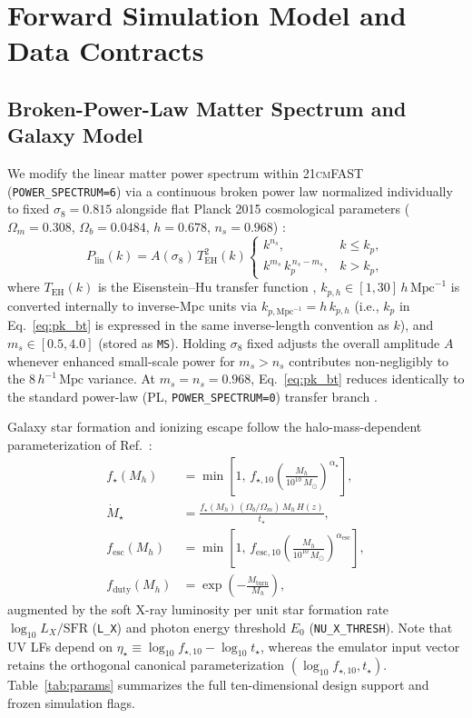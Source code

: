\documentclass[aps,prd,reprint,superscriptaddress,nofootinbib,amsmath,amssymb,floatfix,longbibliography]{revtex4-2}
\begin{document}
\section{Forward Simulation Model and Data Contracts}\label{sec:model}

\subsection{Broken-Power-Law Matter Spectrum and Galaxy Model}\label{sec:bt_model}

We modify the linear matter power spectrum within \textsc{21cmFAST} (\texttt{POWER\_SPECTRUM=6}) via a continuous broken power law normalized individually to fixed $\sigma_8 = 0.815$ alongside flat Planck 2015 cosmological parameters ($\Omega_m = 0.308$, $\Omega_b = 0.0484$, $h = 0.678$, $n_s = 0.968$) \cite{Planck2015,Eisenstein1998}:
\begin{equation}
P_{\mathrm{lin}}(k) = A(\sigma_8)\,T_{\mathrm{EH}}^2(k)
\begin{cases}
k^{n_s}, & k \le k_p,\\
k^{m_s}\,k_p^{\,n_s - m_s}, & k > k_p,
\end{cases}
\label{eq:pk_bt}
\end{equation}
where $T_{\mathrm{EH}}(k)$ is the Eisenstein--Hu transfer function \cite{Eisenstein1998}, $k_{p,h} \in [1, 30]\,h\,\mathrm{Mpc}^{-1}$ is converted internally to inverse-Mpc units via $k_{p,\mathrm{Mpc}^{-1}} = h\,k_{p,h}$ (i.e., $k_p$ in Eq.~\eqref{eq:pk_bt} is expressed in the same inverse-length convention as $k$), and $m_s \in [0.5, 4.0]$ (stored as \texttt{MS}). Holding $\sigma_8$ fixed adjusts the overall amplitude $A$ whenever enhanced small-scale power for $m_s > n_s$ contributes non-negligibly to the $8\,h^{-1}\,\mathrm{Mpc}$ variance. At $m_s = n_s = 0.968$, Eq.~\eqref{eq:pk_bt} reduces identically to the standard power-law (PL, \texttt{POWER\_SPECTRUM=0}) transfer branch \cite{Murray2020}.

Galaxy star formation and ionizing escape follow the halo-mass-dependent parameterization of Ref.~\cite{Park2019}:
\begin{align}
f_\star(M_h) &= \min\!\left[1,\, f_{\star,10}\left(\frac{M_h}{10^{10}\,M_\odot}\right)^{\alpha_\star}\right],\\
\dot{M}_\star &= \frac{f_\star(M_h)\,(\Omega_b/\Omega_m)\,M_h\,H(z)}{t_\star},\\
f_{\mathrm{esc}}(M_h) &= \min\!\left[1,\, f_{\mathrm{esc},10}\left(\frac{M_h}{10^{10}\,M_\odot}\right)^{\alpha_{\mathrm{esc}}}\right],\\
f_{\mathrm{duty}}(M_h) &= \exp\!\left(-\frac{M_{\mathrm{turn}}}{M_h}\right),
\end{align}
augmented by the soft X-ray luminosity per unit star formation rate $\log_{10} L_X/\mathrm{SFR}$ (\texttt{L\_X}) and photon energy threshold $E_0$ (\texttt{NU\_X\_THRESH}). Note that UV LFs depend on $\eta_\star \equiv \log_{10} f_{\star,10} - \log_{10} t_\star$, whereas the emulator input vector retains the orthogonal canonical parameterization $( \log_{10} f_{\star,10}, t_\star )$. Table~\ref{tab:params} summarizes the full ten-dimensional design support and frozen simulation flags.
\end{document}
